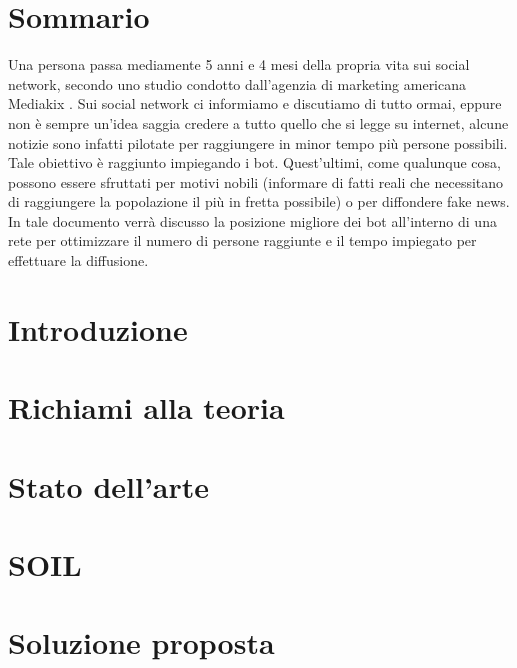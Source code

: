 \documentclass[11pt]{article}
\begin{document}
\newcommand{\CC}{C\nolinebreak\hspace{-.05em}\raisebox{.4ex}{\tiny\bf +}\nolinebreak\hspace{-.10em}\raisebox{.4ex}{\tiny\bf +}}
\def\CC{{C\nolinebreak[4]\hspace{-.05em}\raisebox{.4ex}{\tiny\bf ++}}}

\tableofcontents

\newpage

\section{Sommario}
Una persona passa mediamente 5 anni e 4 mesi della propria vita sui social network, secondo uno studio condotto dall'agenzia di marketing americana Mediakix \cite{mediakix}. Sui social network ci informiamo e discutiamo di tutto ormai, eppure non è sempre un'idea saggia credere a tutto quello che si legge su internet, alcune notizie sono infatti pilotate per raggiungere in minor tempo più persone possibili.
Tale obiettivo è raggiunto impiegando i bot. Quest’ultimi, come qualunque cosa, possono essere sfruttati per motivi nobili (informare di fatti reali che necessitano di raggiungere la popolazione il più in fretta possibile) o per diffondere fake news.
In tale documento verrà discusso la posizione migliore dei bot all’interno di una rete per ottimizzare il numero di persone raggiunte e il tempo impiegato per effettuare la diffusione.

\section{Introduzione}

\section{Richiami alla teoria}

\section{Stato dell'arte}

\section{SOIL}

\section{Soluzione proposta}
\end{document}
